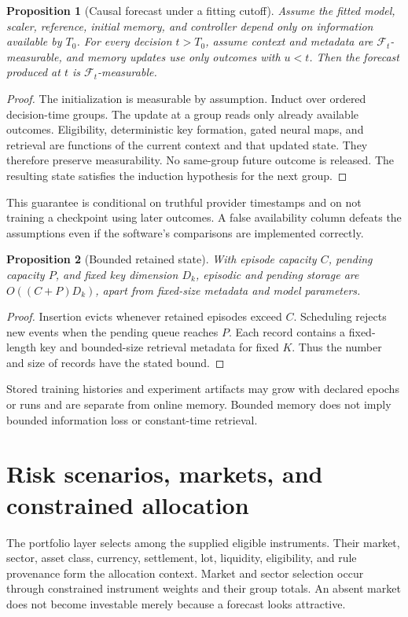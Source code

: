 \documentclass[11pt,a4paper]{article}
\newcommand{\F}{\mathcal F}
\newtheorem{proposition}{Proposition}
\begin{document}
\begin{proposition}[Causal forecast under a fitting cutoff]
Assume the fitted model, scaler, reference, initial memory, and controller depend only on information available by $T_0$. For every decision $t>T_0$, assume context and metadata are $\F_t$-measurable, and memory updates use only outcomes with $u<t$. Then the forecast produced at $t$ is $\F_t$-measurable.
\end{proposition}
\begin{proof}
The initialization is measurable by assumption. Induct over ordered decision-time groups. The update at a group reads only already available outcomes. Eligibility, deterministic key formation, gated neural maps, and retrieval are functions of the current context and that updated state. They therefore preserve measurability. No same-group future outcome is released. The resulting state satisfies the induction hypothesis for the next group.
\end{proof}
This guarantee is conditional on truthful provider timestamps and on not training a checkpoint using later outcomes. A false availability column defeats the assumptions even if the software's comparisons are implemented correctly.

\begin{proposition}[Bounded retained state]
With episode capacity $C$, pending capacity $P$, and fixed key dimension $D_k$, episodic and pending storage are $O((C+P)D_k)$, apart from fixed-size metadata and model parameters.
\end{proposition}
\begin{proof}
Insertion evicts whenever retained episodes exceed $C$. Scheduling rejects new events when the pending queue reaches $P$. Each record contains a fixed-length key and bounded-size retrieval metadata for fixed $K$. Thus the number and size of records have the stated bound.
\end{proof}
Stored training histories and experiment artifacts may grow with declared epochs or runs and are separate from online memory. Bounded memory does not imply bounded information loss or constant-time retrieval.

\section{Risk scenarios, markets, and constrained allocation}

The portfolio layer selects among the supplied eligible instruments. Their market, sector, asset class, currency, settlement, lot, liquidity, eligibility, and rule provenance form the allocation context. Market and sector selection occur through constrained instrument weights and their group totals. An absent market does not become investable merely because a forecast looks attractive.
\end{document}
